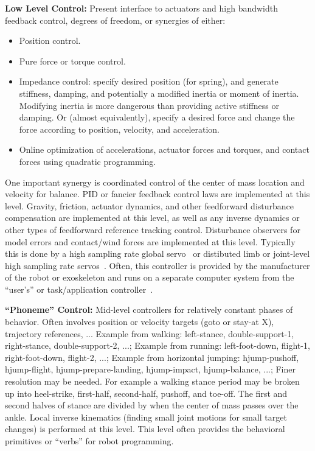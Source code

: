 \documentclass[letterpaper,12pt,fullpage]{article}
\begin{document}
{\bf Low Level Control:} Present interface to actuators and
high bandwidth feedback control, degrees of freedom,
or synergies of either:
\begin{itemize}
\item
Position control.
\item
Pure force or torque control.
\item
Impedance control: specify desired position (for spring), and generate
stiffness, damping, and potentially a modified inertia or moment of inertia.
Modifying inertia is more dangerous than providing active stiffness
or damping.
Or (almost equivalently),
specify a desired force and change the force according to position, velocity,
and acceleration.
\item
Online optimization of accelerations, actuator forces and torques, and contact forces
using quadratic programming.
\end{itemize} 
One important synergy is coordinated control of the center of mass location and
velocity for balance.
PID or fancier feedback control laws are implemented at this level.
Gravity, friction, actuator dynamics, and other feedforward disturbance
compensation are implemented at this level, as well as any inverse dynamics
or other types of feedforward reference tracking control.
Disturbance observers for model errors and contact/wind forces
are implemented at this level.
Typically this is done by a high sampling rate global servo~\cite{Atlas-robot}
or distibuted limb or joint-level high sampling rate servos~\cite{Sarcos-robot}.
Often, this controller is provided by the manufacturer of the robot
or exoskeleton and runs on a separate computer system from the
``user's'' or task/application controller~\cite{Sarcos,Atlas}.

{\bf ``Phoneme'' Control:} Mid-level controllers
for relatively constant phases of behavior.
Often involves position or velocity targets (goto or
stay-at X), trajectory references, ...
Example from walking: left-stance, double-support-1, right-stance, double-support-2, ...;
Example from running: left-foot-down, flight-1, right-foot-down, flight-2, ...;
Example from horizontal jumping: hjump-pushoff, hjump-flight, hjump-prepare-landing, hjump-impact, hjump-balance, ...;
Finer resolution may be needed. For example a walking stance period may
be broken up into heel-strike, first-half, second-half, pushoff, and toe-off.
The first and second halves of stance are divided by when the center of mass
passes over the ankle.
Local inverse kinematics (finding small joint motions for small target changes)
is performed at this level.
This level often provides the behavioral primitives or ``verbs'' for robot programming.
\end{document}
